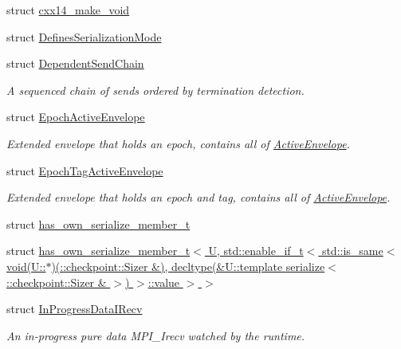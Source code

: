 \begin{DoxyCompactItemize}
\item 
struct \hyperlink{structvt_1_1messaging_1_1cxx14__make__void}{cxx14\+\_\+make\+\_\+void}
\item 
struct \hyperlink{structvt_1_1messaging_1_1_defines_serialization_mode}{Defines\+Serialization\+Mode}
\item 
struct \hyperlink{classvt_1_1messaging_1_1_dependent_send_chain}{Dependent\+Send\+Chain}
\begin{DoxyCompactList}\small\item\em A sequenced chain of sends ordered by termination detection. \end{DoxyCompactList}\item 
struct \hyperlink{structvt_1_1messaging_1_1_epoch_active_envelope}{Epoch\+Active\+Envelope}
\begin{DoxyCompactList}\small\item\em Extended envelope that holds an epoch, contains all of {\ttfamily \hyperlink{structvt_1_1messaging_1_1_active_envelope}{Active\+Envelope}}. \end{DoxyCompactList}\item 
struct \hyperlink{structvt_1_1messaging_1_1_epoch_tag_active_envelope}{Epoch\+Tag\+Active\+Envelope}
\begin{DoxyCompactList}\small\item\em Extended envelope that holds an epoch and tag, contains all of {\ttfamily \hyperlink{structvt_1_1messaging_1_1_active_envelope}{Active\+Envelope}}. \end{DoxyCompactList}\item 
struct \hyperlink{structvt_1_1messaging_1_1has__own__serialize__member__t}{has\+\_\+own\+\_\+serialize\+\_\+member\+\_\+t}
\item 
struct \hyperlink{structvt_1_1messaging_1_1has__own__serialize__member__t_3_01_u_00_01std_1_1enable__if__t_3_01std429d4c0886e02358959789109e87ad22}{has\+\_\+own\+\_\+serialize\+\_\+member\+\_\+t$<$ U, std\+::enable\+\_\+if\+\_\+t$<$ std\+::is\+\_\+same$<$ void(\+U\+::$\ast$)(\+::checkpoint\+::\+Sizer \&), decltype(\&\+U\+::template serialize$<$\+::checkpoint\+::\+Sizer \& $>$) $>$\+::value $>$ $>$}
\item 
struct \hyperlink{structvt_1_1messaging_1_1_in_progress_data_i_recv}{In\+Progress\+Data\+I\+Recv}
\begin{DoxyCompactList}\small\item\em An in-\/progress pure data M\+P\+I\+\_\+\+Irecv watched by the runtime. \end{DoxyCompactList}\item 

\end{DoxyCompactItemize}
